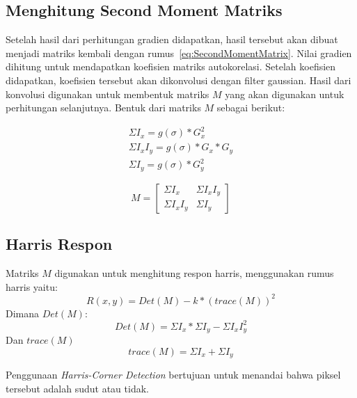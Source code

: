 \subsection{Menghitung Second Moment Matriks}
    Setelah hasil dari perhitungan gradien didapatkan, hasil tersebut akan dibuat menjadi matriks kembali dengan rumus~\eqref{eq:SecondMomentMatrix}. Nilai gradien dihitung untuk mendapatkan koefisien matriks autokorelasi. Setelah koefisien didapatkan, koefisien tersebut akan dikonvolusi dengan filter gaussian.
Hasil dari konvolusi digunakan untuk membentuk matriks \(M\) yang akan digunakan untuk perhitungan selanjutnya. Bentuk dari matriks \(M\) sebagai berikut:

\begin{equation*}
    \begin{aligned}
        \Sigma I_{x} = g(\sigma) * G_{x}^2 \\
        \Sigma I_{x}I_{y} = g(\sigma) * G_{x} * G_{y} \\
        \Sigma I_{y} = g(\sigma) * G_{y}^2
    \end{aligned}
\end{equation*}

\begin{equation}
    M = 
    \begin{bmatrix}
        \Sigma I_{x} & \Sigma I_{x}I_{y} \\
        \Sigma I_{x}I_{y} & \Sigma I_{y}
    \end{bmatrix} 
\end{equation}

\subsection{Harris Respon}
    Matriks \(M\) digunakan untuk menghitung respon harris, menggunakan rumus harris yaitu:
\begin{equation}
    R(x,y) = Det(M) - k * {(trace(M))}^2
\end{equation}
Dimana \(Det(M)\):
\begin{equation*}
    Det(M) = \Sigma I_{x} * \Sigma I_{y} - \Sigma I_{x}I_{y}^2
\end{equation*}
Dan \(trace(M)\) 
\begin{equation*}
    trace(M) = \Sigma I_{x} + \Sigma I_{y}
\end{equation*}

    Penggunaan \emph{Harris-Corner Detection} bertujuan untuk menandai bahwa piksel tersebut adalah sudut atau tidak.


